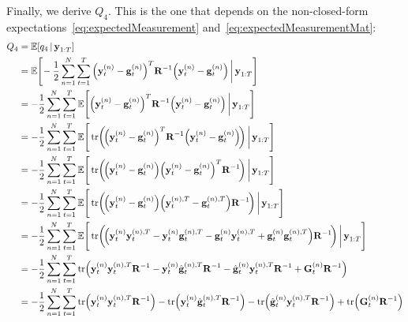 	Finally, we derive \(Q_4\). This is the one that depends on the non-closed-form expectations~\eqref{eq:expectedMeasurement} and~\eqref{eq:expectedMeasurementMat}:
	\begin{align*}
		Q_4
			&= \E[q_4 \given \vec{y}_{1:T}] \\
			&= \E\Bigg[\! -\frac{1}{2} \sum_{n = 1}^{N} \sum_{t = 1}^{T} \Big( \vec{y}_t^{(n)} - \vec{g}_t^{(n)} \Big)^T \mat{R}^{-1} \Big( \vec{y}_t^{(n)} - \vec{g}_t^{(n)} \Big) \bigggiven \vec{y}_{1:T} \Bigg] \\
			&= -\frac{1}{2} \sum_{n = 1}^{N} \sum_{t = 1}^{T} \E\Bigg[ \Big( \vec{y}_t^{(n)} - \vec{g}_t^{(n)} \Big)^T \mat{R}^{-1} \Big( \vec{y}_t^{(n)} - \vec{g}_t^{(n)} \Big) \bigggiven \vec{y}_{1:T} \Bigg] \\
			&= -\frac{1}{2} \sum_{n = 1}^{N} \sum_{t = 1}^{T} \E\Bigg[ \tr\!\bigg(\!\Big( \vec{y}_t^{(n)} - \vec{g}_t^{(n)} \Big)^T \mat{R}^{-1} \Big( \vec{y}_t^{(n)} - \vec{g}_t^{(n)} \Big)\!\bigg) \bigggiven \vec{y}_{1:T} \Bigg] \\
			&= -\frac{1}{2} \sum_{n = 1}^{N} \sum_{t = 1}^{T} \E\Bigg[ \tr\!\bigg(\!\Big( \vec{y}_t^{(n)} - \vec{g}_t^{(n)} \Big) \Big( \vec{y}_t^{(n)} - \vec{g}_t^{(n)} \Big)^T \mat{R}^{-1} \!\bigg) \bigggiven \vec{y}_{1:T} \Bigg] \\
			&= -\frac{1}{2} \sum_{n = 1}^{N} \sum_{t = 1}^{T} \E\Bigg[ \tr\!\bigg(\!\Big( \vec{y}_t^{(n)} - \vec{g}_t^{(n)} \Big) \Big( \vec{y}_t^{(n), T} - \vec{g}_t^{(n), T} \Big) \mat{R}^{-1} \!\bigg) \bigggiven \vec{y}_{1:T} \Bigg] \\
			&= -\frac{1}{2} \sum_{n = 1}^{N} \sum_{t = 1}^{T} \E\Bigg[ \tr\!\bigg(\!\Big( \vec{y}_t^{(n)} \vec{y}_t^{(n), T} - \vec{y}_t^{(n)} \vec{g}_t^{(n), T} - \vec{g}_t^{(n)} \vec{y}_t^{(n), T} + \vec{g}_t^{(n)} \vec{g}_t^{(n), T} \Big) \mat{R}^{-1} \!\bigg) \bigggiven \vec{y}_{1:T} \Bigg] \\
			&= -\frac{1}{2} \sum_{n = 1}^{N} \sum_{t = 1}^{T} \tr\!\Big( \vec{y}_t^{(n)} \vec{y}_t^{(n), T} \mat{R}^{-1} - \vec{y}_t^{(n)} \hat{\vec{g}}_t^{(n), T} \mat{R}^{-1} - \hat{\vec{g}}_t^{(n)} \vec{y}_t^{(n), T} \mat{R}^{-1} + \mat{G}_t^{(n)} \mat{R}^{-1} \Big) \\
			&= -\frac{1}{2} \sum_{n = 1}^{N} \sum_{t = 1}^{T} \tr\!\Big( \vec{y}_t^{(n)} \vec{y}_t^{(n), T} \mat{R}^{-1} \Big) - \tr\!\Big( \vec{y}_t^{(n)} \hat{\vec{g}}_t^{(n), T} \mat{R}^{-1} \Big) - \tr\!\Big( \hat{\vec{g}}_t^{(n)} \vec{y}_t^{(n), T} \mat{R}^{-1} \Big) + \tr\!\Big( \mat{G}_t^{(n)} \mat{R}^{-1} \Big)
	\end{align*}

